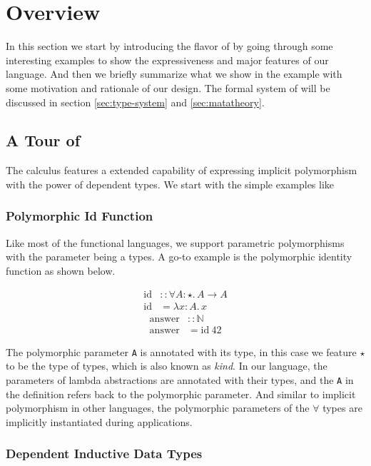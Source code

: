 \section{Overview}

In this section we start by introducing the flavor of \name by going through
some interesting examples to show the expressiveness and major features of our
language. And then we briefly summarize what we show in the example with
some motivation and rationale of our design. The formal system of \name will be
discussed in section \ref{sec:type-system} and \ref{sec:matatheory}.

\subsection{A Tour of \name}
\label{sec:examples}

The \name calculus features a extended capability of expressing implicit
polymorphism with the power of dependent types. We start with the simple
examples like

\subsubsection{Polymorphic Id Function}

Like most of the functional languages, we support parametric polymorphisms with
the parameter being a types. A go-to example is the polymorphic identity
function as shown below.

\begin{align*}
\mathrm{id} &:: \forall A : \star.\, A \rightarrow A \\
\mathrm{id} &= \lambda x : A.\, x
\end{align*}
\begin{align*}
\mathrm{answer} &:: \mathbb{N} \\
\mathrm{answer} &= \mathrm{id} ~ 42
\end{align*}

The polymorphic parameter \verb|A| is annotated with its type,
in this case we feature $\star$ to be the type of types, which is also known as
\emph{kind}. In our language, the parameters of lambda abstractions are annotated
with their types, and the \verb|A| in the definition refers back to the
polymorphic parameter. And similar to implicit polymorphism in other languages,
the polymorphic parameters of the $\forall$ types are implicitly instantiated
during applications.

\subsubsection{Dependent Inductive Data Types}


